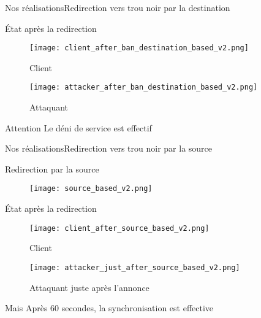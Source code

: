 \begin{frame}{Nos réalisations}{Redirection vers trou noir par la destination}
    {\large \centerline{État après la redirection}}
    \begin{minipage}{0.49\textwidth}
        \begin{figure}[H]
            \texttt{[image: client\_after\_ban\_destination\_based\_v2.png]}
            \caption*{Client}
        \end{figure}
    \end{minipage}
    \hfill
    \begin{minipage}{0.49\textwidth}
        \begin{figure}[H]
            \texttt{[image: attacker\_after\_ban\_destination\_based\_v2.png]}
            \caption*{Attaquant}
        \end{figure}
    \end{minipage}

    \begin{alertblock}{Attention}
        Le déni de service est effectif
    \end{alertblock}
\end{frame}

\begin{frame}{Nos réalisations}{Redirection vers trou noir par la source}
    \begin{minipage}{0.5\textwidth}
        {\large Redirection par la source}
        \begin{figure}
            \texttt{[image: source\_based\_v2.png]}
        \end{figure}
    \end{minipage}
    \hfill
    \begin{minipage}{0.38\textwidth}
        {\large État après la redirection}
        \begin{figure}[H]
            \texttt{[image: client\_after\_source\_based\_v2.png]}
            \caption*{Client}
        \end{figure}

        \begin{figure}[H]
            \texttt{[image: attacker\_just\_after\_source\_based\_v2.png]}
            \caption*{Attaquant juste après l'annonce}
        \end{figure}

        \begin{alertblock}{Mais}
            Après 60 secondes, la synchronisation est effective
        \end{alertblock}
    \end{minipage}
\end{frame}

